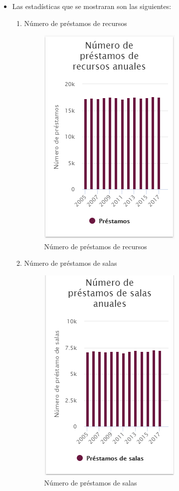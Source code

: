 \begin{itemize}
	\item  Las estadísticas que se mostraran son las siguientes:
	\begin{enumerate}
		
		\item Número de préstamos de recursos
		\begin{figure}[hbtp]
	\includegraphics[scale=0.7]{images/InterfazMovil/IUGS15_recursosTodos.PNG}
	\caption{Número de préstamos de recursos}
	\end{figure}
	
	\item Número de préstamos de salas
	\begin{figure}[hbtp]
	\includegraphics[scale=0.7]{images/InterfazMovil/IUGS15_salasTodos.PNG}
	\caption{Número de préstamos de salas}
	\end{figure}
	

\end{enumerate}
\end{itemize}
